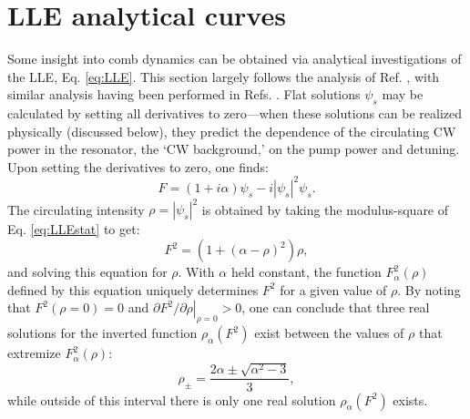 \section{LLE analytical curves}
Some insight into comb dynamics can be obtained via analytical investigations of the LLE, Eq. \ref{eq:LLE}. This section largely follows the analysis of Ref. \cite{Godey2014}, with similar analysis having been performed in Refs. \cite{others}. Flat solutions $\psi_s$ may be calculated by setting all derivatives to zero---when these solutions can be realized physically (discussed below), they predict the dependence of the circulating CW power in the resonator, the `CW background,' on the pump power and detuning. Upon setting the derivatives to zero, one finds:
\begin{equation}
F=(1+i\alpha)\psi_s-i|\psi_s|^2\psi_s. \label{eq:LLEstat}
\end{equation}
The circulating intensity $\rho=|\psi_s|^2$ is obtained by taking the modulus-square of Eq. \ref{eq:LLEstat} to get:
\begin{equation}
F^2=\left(1+(\alpha-\rho)^2\right)\rho\label{eq:LLEstat2},
\end{equation} 
and solving this equation for $\rho$. With $\alpha$ held constant, the function $F^2_\alpha(\rho)$ defined by this equation uniquely determines $F^2$ for a given value of $\rho$. By noting that $F^2(\rho=0)=0$ and $\left.\partial F^2/\partial \rho\right|_{\rho=0}>0$, one can conclude that three real solutions for the inverted function $\rho_\alpha(F^2)$ exist between the values of $\rho$ that extremize $F^2_\alpha(\rho)$:
\begin{equation}
\rho_\pm=\frac{2\alpha\pm\sqrt{\alpha^2-3}}{3},
\end{equation}
while outside of this interval there is only one real solution $\rho_\alpha(F^2)$ exists.

